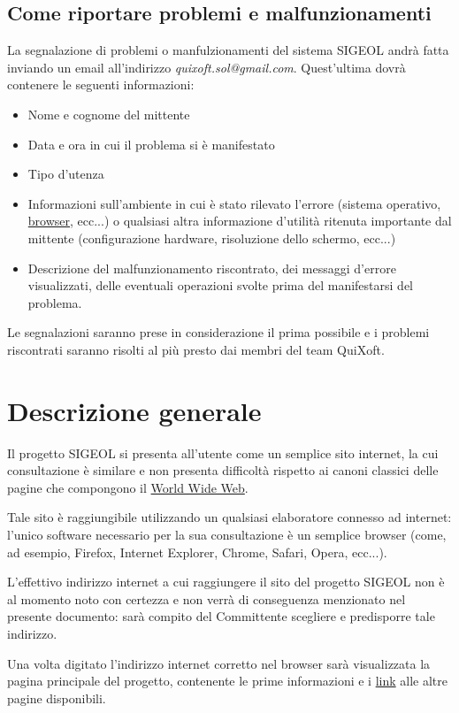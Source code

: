 \documentclass[11pt,a4paper]{article}
\begin{document}
\subsection{Come riportare problemi e malfunzionamenti}
La segnalazione di problemi o manfulzionamenti del sistema SIGEOL andrà fatta inviando un email all'indirizzo \textit{quixoft.sol@gmail.com}.
Quest'ultima dovrà contenere le seguenti informazioni:
\begin{itemize}
 \item Nome e cognome del mittente
 \item Data e ora in cui il problema si è manifestato
 \item Tipo d'utenza
 \item Informazioni sull'ambiente in cui è stato rilevato l'errore (sistema operativo, \underline{browser}, ecc...) o qualsiasi altra informazione d'utilità ritenuta importante dal mittente (configurazione hardware, risoluzione dello schermo, ecc...)
 \item Descrizione del malfunzionamento riscontrato, dei messaggi d'errore visualizzati, delle eventuali operazioni svolte prima del manifestarsi del problema.
\end{itemize}
Le segnalazioni saranno prese in considerazione il prima possibile e i problemi riscontrati saranno risolti al più presto dai membri del team QuiXoft.
\section{Descrizione generale}
Il progetto SIGEOL si presenta all'utente come un semplice sito internet, la cui consultazione è similare e non presenta difficoltà rispetto ai canoni classici delle pagine che compongono il \underline{World Wide Web}.

Tale sito è raggiungibile utilizzando un qualsiasi elaboratore connesso ad internet: l'unico software necessario per la sua consultazione è un semplice browser (come, ad esempio, Firefox, Internet Explorer, Chrome, Safari, Opera, ecc...).

L'effettivo indirizzo internet a cui raggiungere il sito del progetto SIGEOL non è al momento noto con certezza e non verrà di conseguenza menzionato nel presente documento: sarà compito del Committente scegliere e predisporre tale indirizzo.

Una volta digitato l'indirizzo internet corretto nel browser sarà visualizzata la pagina principale del progetto, contenente le prime informazioni e i \underline{link} alle altre pagine disponibili.
\end{document}
